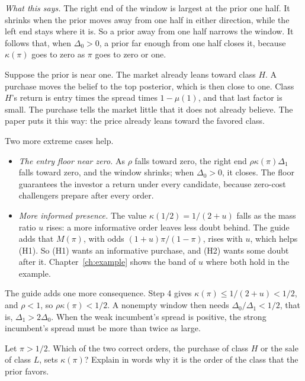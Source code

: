 \emph{What this says.} The right end of the window is largest at the prior one half. It shrinks when the prior
moves away from one half in either direction, while the left end stays where it is. So a prior away from one half
narrows the window. It follows that, when \(\Delta_0>0\), a prior far enough from one half closes it, because
\(\kappa(\pi)\) goes to zero as \(\pi\) goes to zero or one.

\begin{intuition}
Suppose the prior is near one. The market already leans toward class \(H\). A purchase moves the belief to the top
posterior, which is then close to one. Class \(H\)'s return is entry times the spread times \(1-\mu(1)\), and that
last factor is small. The purchase tells the market little that it does not already believe. The paper puts it
this way: the price already leans toward the favored class.
\end{intuition}

Two more extreme cases help.
\begin{itemize}
\item \emph{The entry floor near zero.} As \(\rho\) falls toward zero, the right end \(\rho\kappa(\pi)\Delta_1\)
  falls toward zero, and the window shrinks; when \(\Delta_0>0\), it closes. The floor guarantees the investor a
  return under every candidate, because zero-cost challengers prepare after every order.
\item \emph{More informed presence.} The value \(\kappa(1/2)=1/(2+u)\) falls as the mass ratio \(u\) rises: a more
  informative order leaves less doubt behind. The guide adds that \(M(\pi)\), with odds \((1+u)\pi/(1-\pi)\), rises with
  \(u\), which helps (H1). So (H1) wants an informative purchase, and (H2) wants some doubt after it.
  Chapter~\ref{ch:example} shows the band of \(u\) where both hold in the example.
\end{itemize}

The guide adds one more consequence. Step 4 gives \(\kappa(\pi)\le1/(2+u)<1/2\), and \(\rho<1\), so
\(\rho\kappa(\pi)<1/2\). A nonempty window then needs \(\Delta_0/\Delta_1<1/2\), that is, \(\Delta_1>2\Delta_0\). When
the weak incumbent's spread is positive, the strong incumbent's spread must be more than twice as large.

\begin{checkyourself}
Let \(\pi>1/2\). Which of the two correct orders, the purchase of class \(H\) or the sale of class \(L\), sets
\(\kappa(\pi)\)? Explain in words why it is the order of the class that the prior favors.
\label{q:ccc-window}
\end{checkyourself}

